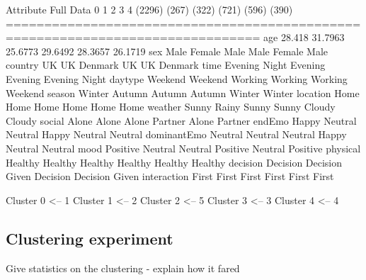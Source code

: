 \documentclass{article}
\begin{document}
Attribute      Full Data          0          1          2          3          4
                  (2296)      (267)      (322)      (721)      (596)      (390)
===============================================================================
age               28.418    31.7963    25.6773    29.6492    28.3657    26.1719
sex                 Male     Female       Male       Male     Female       Male
country               UK         UK    Denmark         UK         UK    Denmark
time             Evening      Night    Evening    Evening    Evening      Night
daytype          Weekend    Weekend    Working    Working    Working    Weekend
season            Winter     Autumn     Autumn     Autumn     Winter     Winter
location            Home       Home       Home       Home       Home       Home
weather            Sunny      Rainy      Sunny      Sunny     Cloudy     Cloudy
social             Alone      Alone      Alone    Partner      Alone    Partner
endEmo             Happy    Neutral    Neutral      Happy    Neutral    Neutral
dominantEmo      Neutral    Neutral    Neutral      Happy    Neutral    Neutral
mood            Positive    Neutral    Neutral   Positive    Neutral   Positive
physical         Healthy    Healthy    Healthy    Healthy    Healthy    Healthy
decision        Decision   Decision      Given   Decision   Decision      Given
interaction        First      First      First      First      First      First

Cluster 0 <-- 1
Cluster 1 <-- 2
Cluster 2 <-- 5
Cluster 3 <-- 3
Cluster 4 <-- 4


\subsection{Clustering experiment} 
Give statistics on the clustering - explain how it fared



%  
%
%
%
\end{document}

